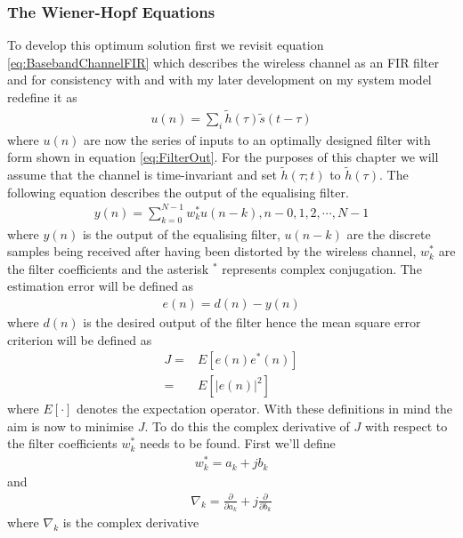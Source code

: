\subsubsection{The Wiener-Hopf Equations}
To develop this optimum solution first we revisit equation %
\ref{eq:BasebandChannelFIR} which describes the wireless channel %
as an FIR filter and for consistency with \cite{Hay02} and %
with my later development on my system model redefine it as
\begin{align}
	u(n) = \sum_{i}\tilde{h}(\tau)\tilde{s}(t-\tau)
	\label{eq:ChannelOut}
\end{align}
where $u(n)$ are now the series of inputs to an optimally %
designed filter with form shown in equation \ref{eq:FilterOut}. %
For the purposes of this chapter %
we will assume that the channel is time-invariant and set %
$\tilde{h}(\tau;t)$ to $\tilde{h}(\tau)$. The following %
equation describes the output of the equalising filter.
\begin{align}
	y(n) = \sum_{k=0}^{N-1}w_{k}^{*}u(n-k), n - 0,1,2,\cdots,N-1
	\label{eq:FilterOut}
\end{align}
where $y(n)$ is the output of the equalising filter, %
$u(n-k)$ are the discrete samples being received %
after having been distorted by the wireless channel, %
$w_{k}^{*}$ are the %
filter coefficients and the asterisk $^*$ represents %
complex conjugation. The estimation error will be defined as 
\begin{align}
	e(n) = d(n) - y(n)
	\label{eq:EstimationError}
\end{align}
where $d(n)$ is the desired output of the filter %
hence the %
mean square error criterion will be defined as
\begin{align}
	J =& E\left[e(n)e^{*}(n)\right]
	\label{eq:MeanSquareError}\\
	=& E\left[\lvert e(n) \rvert^{2}\right]
\end{align}
where $E\left[\cdot\right]$ denotes the expectation %
operator. With these definitions in mind the aim is now %
to minimise $J$. To do this the complex derivative of $J$ with %
respect to the filter coefficients $w_{k}^{*}$ needs %
to be found. First we'll define
\begin{align}
	w_{k}^{*} = a_{k} + jb_{k}
\end{align}
and 
\begin{align}
	\nabla_{k} = \frac{\partial}{\partial a_{k}} + j 
	\frac{\partial}{\partial b_{k}}
\end{align}
where $\nabla_{k}$ is the complex derivative %
